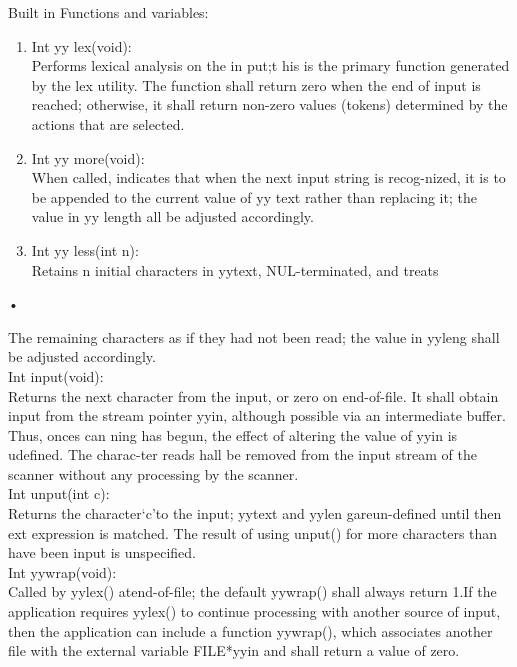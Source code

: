 \documentclass[11pt]{article}
\begin{document}
	\noindent
	Built in Functions and variables:\\
	\begin{enumerate}
		\item Int yy lex(void):\\
		Performs lexical analysis on the in put;t his is the primary function generated by the lex utility. The function shall return zero when the end of input is reached; otherwise, it shall return non-zero values (tokens) determined by the actions that are selected.\\
		\item Int yy more(void):\\
		When called, indicates that when the next input string is recog-nized, it is to be appended to the current value of yy text rather than replacing it; the value in yy length all be adjusted accordingly.\\
		\item Int yy less(int n):\\
		Retains n initial characters in yytext, NUL-terminated, and treats
		
	\end{enumerate}•
	
	\noindent
	The remaining characters as if they had not been read; the value in yyleng shall be adjusted accordingly.\\
	
	\noindent
	Int input(void):\\
	Returns the next character from the input, or zero on end-of-file. It shall obtain input from the stream pointer yyin, although possible via an intermediate buffer. Thus, onces can ning has begun, the effect of altering the value of yyin is udefined. The charac-ter reads hall be removed from the input stream of the scanner without any processing by the scanner.\\
	
	\noindent
	Int unput(int c):\\
	Returns the character‘c’to the input; yytext and yylen gareun-defined until then ext expression is matched. The result of using unput() for more characters than have been input is unspecified.\\
	
	\noindent
	Int yywrap(void):\\
	Called by yylex() atend-of-file; the default yywrap() shall always return 1.If the application requires  yylex() to continue processing with another source of input, then the application can include a function yywrap(), which associates another file with the external variable FILE*yyin and shall return a value of zero.\\
	
\end{document}
